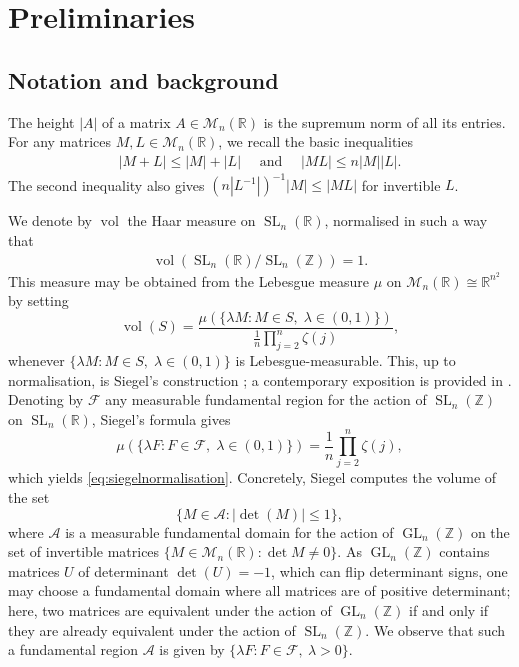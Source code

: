 \documentclass[11pt,reqno]{amsart}
\theoremstyle{definition}
\theoremstyle{remark}
\newcommand{\vol}{\operatorname{vol}}
\newcommand{\GL}{\operatorname{GL}}
\newcommand{\SL}{\operatorname{SL}}
\numberwithin{equation}{section}
\numberwithin{thm}{section}
\numberwithin{table}{section}
\def\cM{{\mathcal M}}
\def \R {{\mathbb R}}
\def \Z {{\mathbb Z}}
\newcommand{\RR}{\mathbb R}
\begin{document}
\section{Preliminaries} 

\subsection{Notation and background }
The height $|A|$ of a  matrix $A \in \cM_n(\R)$ is 
the supremum norm of all its  entries.
For any matrices $M,L \in \mathcal{M}_n(\RR)$, we recall the basic inequalities
\begin{align}\label{eq:basic_infty_norm_inequ}
    | M + L | \le  | M| +
    | L| \quad
    \text{ and } \quad
    | M  L| \le  n| M | 
    | L|.
\end{align}
The  second inequality also gives $(n|L^{-1}|)^{-1}
    | M | 
    \le 
    | M  L| $ for invertible $L$.
    
    



We denote by $\vol$ the Haar measure on 
$\SL_n(\R)$, normalised in such a way that 
\begin{align}\label{eq:siegelnormalisation}
    \vol (\SL_n(\R) / \SL_n(\Z)) = 1.
\end{align}
This measure may be obtained from the Lebesgue measure $\mu$ on $\mathcal{M}_{n}(\R) \cong \R^{n^2}$ by setting 
\[
    \vol(S) =
    \frac{
    \mu 
    \left( 
    \{
    \lambda M : M \in S, \; \lambda \in (0,1) 
    \}
    \right)
    }{\frac{1}{n} \prod_{j=2}^n \zeta (j)},
\]
whenever $\{
    \lambda M: M \in S, \; \lambda \in (0,1) 
    \}$ is Lebesgue-measurable. This, up to normalisation, is Siegel's construction \cite[\S3]{siegemvt}; a  contemporary exposition is provided in \cite[\S2]{volumesgilletgrayson}. 
    Denoting by $\mathcal{F}$ any measurable fundamental region for the action of $\SL_n(\Z)$ on $\SL_n(\R)$, Siegel's formula \cite[Lecture XV]{siegel} gives
$$
    \mu \left( 
    \{
    \lambda F : F \in \mathcal{F}, \; \lambda \in (0,1) 
    \}
    \right) = 
    \frac{1}{n} \prod_{j=2}^n \zeta (j),
$$
which yields \eqref{eq:siegelnormalisation}. Concretely, Siegel computes the volume of the set 
$$
\{M \in \mathcal{A} : |\det(M)| \le 1 \}, 
$$
where $\mathcal{A}$ is a measurable fundamental domain for the action of $\GL_n(\Z)$ on the set of invertible matrices $\{M \in \mathcal{M}_n(\R): \det M \neq 0 \}$. As $\GL_n(\Z)$ contains matrices $U$ of determinant $\det(U)=-1$, which can flip determinant signs, one may choose a fundamental domain where all matrices are of positive determinant; here, two matrices are equivalent under the action of $\GL_n(\Z)$ if and only if they are already equivalent under the action of $\SL_n(\Z)$. 
We observe that such a fundamental region $\mathcal{A}$ is given by $\{\lambda F : F \in \mathcal{F}, \: \lambda > 0 \}$. 
\end{document}
